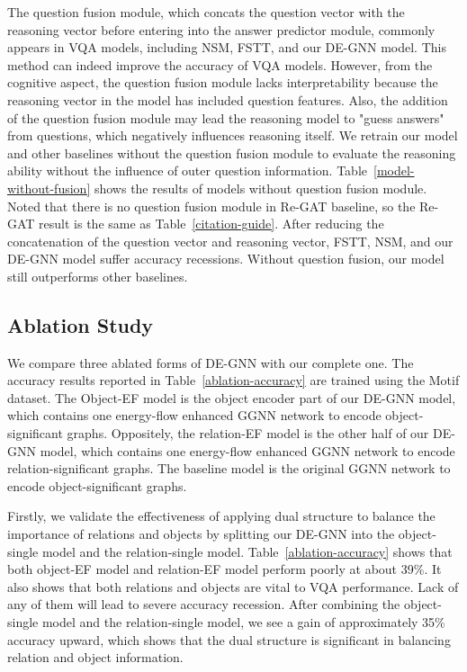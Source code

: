 \documentclass[letterpaper]{article} %
\begin{document}
The question fusion module, which concats the question vector with the reasoning vector before entering into the answer predictor module, commonly appears in VQA models, including NSM, FSTT, and our DE-GNN model. This method can indeed improve the accuracy of VQA models. However, from the cognitive aspect, the question fusion module lacks interpretability because the reasoning vector in the model has included question features. Also, the addition of the question fusion module may lead the reasoning model to "guess answers" from questions, which negatively influences reasoning itself. We retrain our model and other baselines without the question fusion module to evaluate the reasoning ability without the influence of outer question information. Table~\ref{model-without-fusion} shows the results of models without question fusion module. Noted that there is no question fusion module in Re-GAT baseline, so the Re-GAT result is the same as Table~\ref{citation-guide}.
After reducing the concatenation of the question vector and reasoning vector, FSTT, NSM, and our DE-GNN model suffer accuracy recessions. Without question fusion, our model still outperforms other baselines.

\subsection{Ablation Study}

We compare three ablated forms of DE-GNN with our complete one. The accuracy results reported in Table~\ref{ablation-accuracy} are trained using the Motif dataset. The Object-EF model is the object encoder part of our DE-GNN model, which contains one energy-flow enhanced GGNN network to encode object-significant graphs. Oppositely, the relation-EF model is the other half of our DE-GNN model, which contains one energy-flow enhanced GGNN network to encode relation-significant graphs. The baseline model is the original GGNN network to encode object-significant graphs.

Firstly, we validate the effectiveness of applying dual structure to balance the importance of relations and objects by splitting our DE-GNN into the object-single model and the relation-single model. Table~\ref{ablation-accuracy} shows that both object-EF model and relation-EF model perform poorly at about 39\%. It also shows that both relations and objects are vital to VQA performance. Lack of any of them will lead to severe accuracy recession. After combining the object-single model and the relation-single model, we see a gain of approximately 35\% accuracy upward, which shows that the dual structure is significant in balancing relation and object information. 
\end{document}
